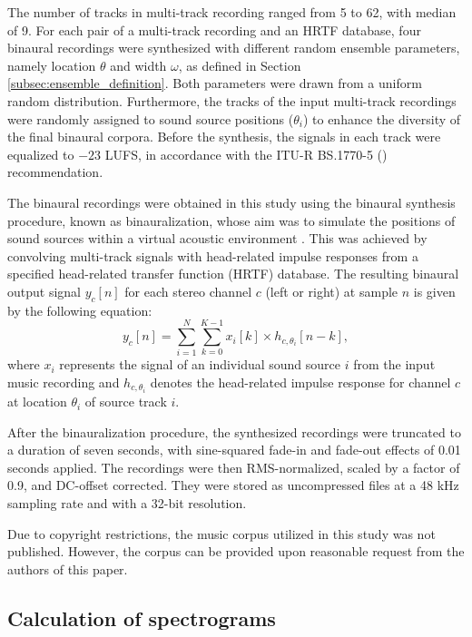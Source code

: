 \documentclass[11pt]{article}
\begin{document}
The number of tracks in multi-track recording ranged from 5 to 62, with median of 9. For each pair of a multi-track recording and an HRTF database, four binaural recordings were synthesized with different random ensemble parameters, namely location $\theta$ and width $\omega$, as defined in Section \ref{subsec:ensemble_definition}. Both parameters were drawn from a uniform random distribution. Furthermore, the tracks of the input multi-track recordings were randomly assigned to sound source positions ($\theta_i$) to enhance the diversity of the final binaural corpora. Before the synthesis, the signals in each track were equalized to $-23$ LUFS, in accordance with the ITU-R BS.1770-5 (\citeyear{noauthor_itu-r_2023}) recommendation. 

The binaural recordings were obtained in this study using the binaural synthesis procedure, known as binauralization, whose aim was to simulate the positions of sound sources within a virtual acoustic environment \parencite{blauert_spatial_1996}. This was achieved by convolving multi-track signals with head-related impulse responses from a specified head-related transfer function (HRTF) database. The resulting binaural output signal $y_c[n]$ for each stereo channel $c$ (left or right) at sample $n$ is given by the following equation:
\begin{equation}
  y_c[n] = \sum_{i=1}^{N} \sum_{k=0}^{K-1} x_i[k] \times h_{c,\theta_i}[n-k] ,
\end{equation}
where $x_i$ represents the signal of an individual sound source $i$ from the input music recording and $h_{c,\theta_i}$ denotes the head-related impulse response for channel $c$ at location $\theta_i$ of source track $i$.

After the binauralization procedure, the synthesized recordings were truncated to a duration of seven seconds, with sine-squared fade-in and fade-out effects of 0.01 seconds applied. The recordings were then RMS-normalized, scaled by a factor of 0.9, and DC-offset corrected. They were stored as uncompressed files at a 48 kHz sampling rate and with a 32-bit resolution.

Due to copyright restrictions, the music corpus utilized in this study was not published. However, the corpus can be provided upon reasonable request from the authors of this paper.

\subsection{Calculation of spectrograms}
\label{subsec:feature_extraction}
\end{document}
